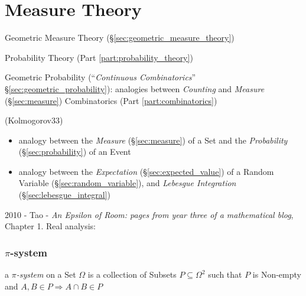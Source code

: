 \part{Measure Theory}\label{part:measure_theory}

\fist Geometric Measure Theory (\S\ref{sec:geometric_measure_theory})

\fist Probability Theory (Part \ref{part:probability_theory})

\fist Geometric Probability (``\emph{Continuous Combinatorics}''
\S\ref{sec:geometric_probability}): analogies between \emph{Counting} and
\emph{Measure} (\S\ref{sec:measure}) \fist Combinatorics (Part
\ref{part:combinatorics})

(Kolmogorov33)

\begin{itemize}
  \item analogy between the \emph{Measure} (\S\ref{sec:measure}) of a Set and
    the \emph{Probability} (\S\ref{sec:probability}) of an Event
  \item analogy between the \emph{Expectation} (\S\ref{sec:expected_value}) of a
    Random Variable (\S\ref{sec:random_variable}), and \emph{Lebesgue
      Integration} (\S\ref{sec:lebesgue_integral})
\end{itemize}

2010 - Tao - \emph{An Epsilon of Room: pages from year three of a mathematical
  blog}, Chapter 1. Real analysis:



\section{$\pi$-system}\label{sec:pi_system}

a \emph{$\pi$-system} on a Set $\Omega$ is a collection of Subsets
$P \subseteq \Omega^2$ such that $P$ is Non-empty and
$A, B \in P \Rightarrow A \cap B \in P$



